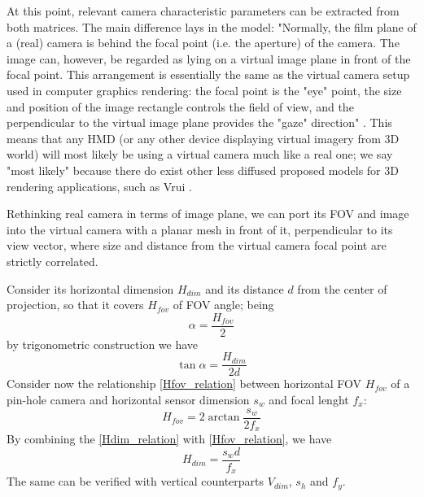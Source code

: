 At this point, relevant camera characteristic parameters can be extracted from both matrices. The main difference lays in the model: "Normally, the film plane of a (real) camera is behind the focal point (i.e. the aperture) of the camera. The image can, however, be regarded as lying on a virtual image plane in front of the focal point. This arrangement is essentially the same as the virtual camera setup used in computer graphics rendering: the focal point is the "eye" point, the size and position of the image rectangle controls the field of view, and the perpendicular to the virtual image plane provides the "gaze" direction" \cite{cg_rendering}. This means that any HMD (or any other device displaying virtual imagery from 3D world) will most likely be using a virtual camera much like a real one; we say "most likely" because there do exist other less diffused proposed models for 3D rendering applications, such as Vrui \cite{link_vrui}.

Rethinking real camera in terms of image plane, we can port its FOV and image into the virtual camera with a planar mesh in front of it, perpendicular to its view vector, where size and distance from the virtual camera focal point are strictly correlated.

Consider its horizontal dimension $H_{dim}$ and its distance $d$ from the center of projection, so that it covers $H_{fov}$ of FOV angle; being
\begin{equation}
\alpha = \frac {H_{fov}} {2}
\end{equation}
by trigonometric construction we have
\begin{equation}
\tan \alpha = \frac {H_{dim}} {2 d}
\label{Hdim_relation}
\end{equation}
Consider now the relationship \ref{Hfov_relation} between horizontal FOV $H_{fov}$ of a pin-hole camera and horizontal sensor dimension $s_{w}$ and focal lenght $f_x$: 
\begin{equation}
H_{fov} = 2 \arctan \frac {s_{w}} {2 f_x}
\label{Hfov_relation}
\end{equation}
By combining the \ref{Hdim_relation} with \ref{Hfov_relation}, we have 
\begin{equation}
H_{dim} = \frac {s_{w} d} {f_x}
\label{fov_distance_relation}
\end{equation}
The same can be verified with vertical counterparts $V_{dim}$, $s_{h}$ and $f_y$.

